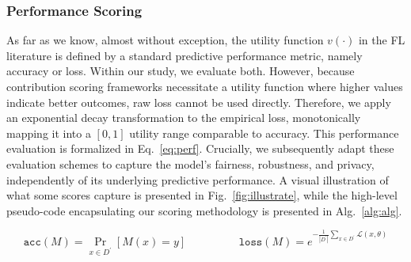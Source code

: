 \documentclass[acmsmall]{acmart}
\begin{document}
\subsubsection*{Performance Scoring}

As far as we know, almost without exception, the utility function $v(\cdot)$ in the FL literature is defined by a standard predictive performance metric, namely accuracy or loss. Within our study, we evaluate both. However, because contribution scoring frameworks necessitate a utility function where higher values indicate better outcomes, raw loss cannot be used directly. Therefore, we apply an exponential decay transformation to the empirical loss, monotonically mapping it into a $[0, 1]$ utility range comparable to accuracy. This performance evaluation is formalized in Eq.~\eqref{eq:perf}. Crucially, we subsequently adapt these evaluation schemes to capture the model's fairness, robustness, and privacy, independently of its underlying predictive performance. A visual illustration of what some scores capture is presented in Fig.~\ref{fig:illustrate}, while the high-level pseudo-code encapsulating our scoring methodology is presented in Alg.~\ref{alg:alg}. 

\begin{equation}
    \label{eq:perf}
    \mathtt{acc}(M) = \Pr_{x\in D^\prime}[M(x) = y]
    \hspace{2cm}
    \mathtt{loss}(M) = e^{-\frac{1}{|D^\prime|}\sum_{x\in D^\prime}\mathcal{L}(x,\theta)}
\end{equation}
\end{document}
